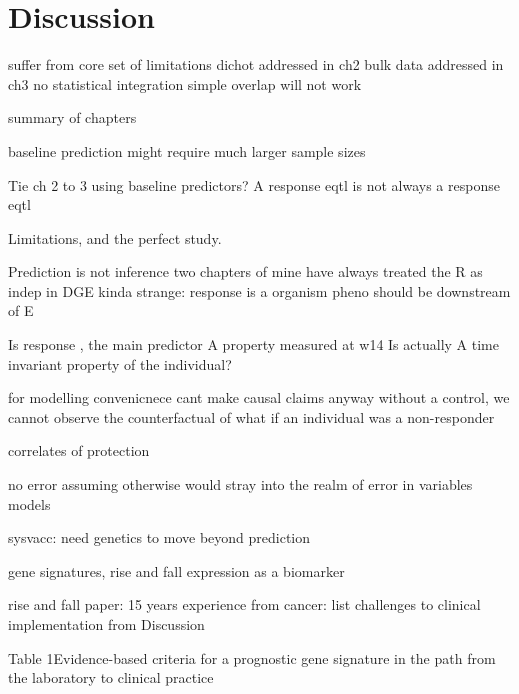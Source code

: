 %
%

\chapter{Discussion}

\begin{outline}

suffer from core set of limitations 
    dichot
        addressed in ch2
    bulk data
        addressed in ch3
    no statistical integration
        simple overlap will not work

summary of chapters

    baseline prediction might require much larger sample sizes

    Tie ch 2 to 3 using baseline predictors?
    A response eqtl is not always a response eqtl

    Limitations, and the perfect study.

Prediction is not inference
    two chapters of mine
    have always treated the R as indep in DGE
    kinda strange: response is a organism pheno should be downstream of E

        Is response , the main predictor
        A property measured at w14
        Is actually A time invariant property of the individual?

        for modelling convenicnece
        cant make causal claims anyway
            without a control, we cannot observe the counterfactual of what if an individual was a non-responder

        correlates of protection

        no error
            assuming otherwise would stray into the realm of error in variables models
        


    sysvacc: need genetics to move beyond prediction

    gene signatures, rise and fall
        expression as a biomarker

        rise and fall paper: 15 years experience from cancer: list challenges to clinical implementation from Discussion

        Table 1Evidence-based criteria for a prognostic gene signature in the path from the laboratory to clinical practice


\end{outline}
